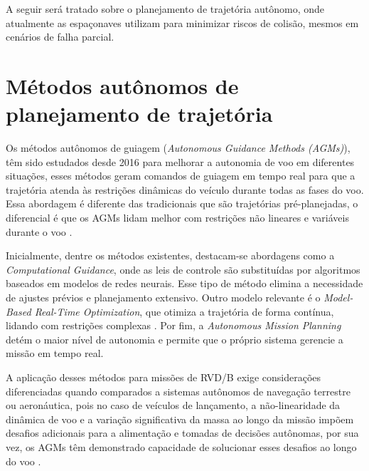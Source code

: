 A seguir será tratado sobre o planejamento de trajetória autônomo, onde atualmente as espaçonaves utilizam para minimizar riscos de colisão, mesmos em cenários de falha parcial.

\section{Métodos autônomos de planejamento de trajetória}

Os métodos autônomos de guiagem (\emph{Autonomous Guidance Methods  (AGMs)}), têm sido estudados desde 2016 para melhorar a autonomia de voo em diferentes situações, esses métodos geram comandos de guiagem em tempo real para que a trajetória atenda às restrições dinâmicas do veículo durante todas as fases do voo.
Essa abordagem é diferente das tradicionais que são trajetórias pré-planejadas, o diferencial é que os AGMs lidam melhor com restrições não lineares e variáveis durante o voo \cite{song2023}.

Inicialmente, dentre os métodos existentes, destacam-se abordagens como a \emph{Computational Guidance}, onde as leis de controle são substituídas por algoritmos baseados em modelos de redes neurais.
Esse tipo de método elimina a necessidade de ajustes prévios e planejamento extensivo.
Outro modelo relevante é o \emph{Model-Based Real-Time Optimization}, que otimiza a trajetória de forma contínua, lidando com restrições complexas \cite{song2023}. Por fim, a \emph{Autonomous Mission Planning} detém o maior nível de autonomia e permite que o próprio sistema gerencie a missão em tempo real.

A aplicação desses métodos para missões de RVD/B exige considerações diferenciadas quando comparados a sistemas autônomos de navegação terrestre ou aeronáutica, pois no caso de veículos de lançamento, a não-linearidade da dinâmica de voo e a variação significativa da massa ao longo da missão impõem desafios adicionais para a alimentação e tomadas de decisões autônomas, por sua vez, os AGMs têm demonstrado capacidade de solucionar esses desafios ao longo do voo \cite{song2023}.